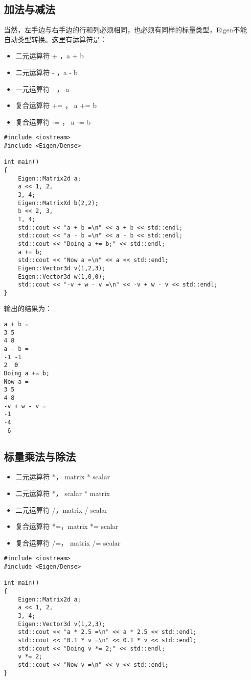 \subsection{加法与减法}
当然，左手边与右手边的行和列必须相同，也必须有同样的标量类型，Eigen不能自动类型转换。这里有运算符是：
\begin{itemize}
\item 二元运算符 + ，a + b
\item 二元运算符 - ，a - b
\item 一元运算符 - ，-a
\item 复合运算符 += ， a += b
\item 复合运算符 -= ， a -= b
\end{itemize}
\begin{lstlisting}[style=Cpp]
#include <iostream>
#include <Eigen/Dense>

int main()
{
	Eigen::Matrix2d a;
	a << 1, 2,
	3, 4;
	Eigen::MatrixXd b(2,2);
	b << 2, 3,
	1, 4;
	std::cout << "a + b =\n" << a + b << std::endl;
	std::cout << "a - b =\n" << a - b << std::endl;
	std::cout << "Doing a += b;" << std::endl;
	a += b;
	std::cout << "Now a =\n" << a << std::endl;
	Eigen::Vector3d v(1,2,3);
	Eigen::Vector3d w(1,0,0);
	std::cout << "-v + w - v =\n" << -v + w - v << std::endl;
}
\end{lstlisting}

输出的结果为：
\begin{lstlisting}
a + b =
3 5
4 8
a - b =
-1 -1
2  0
Doing a += b;
Now a =
3 5
4 8
-v + w - v =
-1
-4
-6
\end{lstlisting}

\subsection{标量乘法与除法}
\begin{itemize}
\item 二元运算符 *， matrix * scalar
\item 二元运算符 *， scalar * matrix
\item 二元运算符 /，matrix / scalar
\item 复合运算符 *=，matrix *= scalar
\item 复合运算符 /=， matrix /= scalar
\end{itemize}

\begin{lstlisting}[style=Cpp]
#include <iostream>
#include <Eigen/Dense>

int main()
{
	Eigen::Matrix2d a;
	a << 1, 2,
	3, 4;
	Eigen::Vector3d v(1,2,3);
	std::cout << "a * 2.5 =\n" << a * 2.5 << std::endl;
	std::cout << "0.1 * v =\n" << 0.1 * v << std::endl;
	std::cout << "Doing v *= 2;" << std::endl;
	v *= 2;
	std::cout << "Now v =\n" << v << std::endl;
}
\end{lstlisting}

